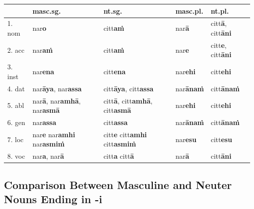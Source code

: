 \documentclass[11pt,oneside]{memoir}
\begin{document}
\begin{center}
\begin{tabular}{lllll}
 & \textbf{masc.sg.} & \textbf{nt.sg.} & \textbf{masc.pl.} & \textbf{nt.pl.}\\
\hline
1. nom & nar\textbf{o} & citt\textbf{aṁ} & nar\textbf{ā} & citt\textbf{ā}, citt\textbf{āni}\\
2. acc & nar\textbf{aṁ} & citt\textbf{aṁ} & nar\textbf{e} & citt\textbf{e}, citt\textbf{āni}\\
3. inst & nar\textbf{ena} & citt\textbf{ena} & nar\textbf{ehi} & citt\textbf{ehi}\\
4. dat & nar\textbf{āya}, nar\textbf{assa} & citt\textbf{āya}, citt\textbf{assa} & nar\textbf{ānaṁ} & citt\textbf{ānaṁ}\\
5. abl & nar\textbf{ā}, nar\textbf{amhā}, nar\textbf{asmā} & citt\textbf{ā}, citt\textbf{amhā}, citt\textbf{asmā} & nar\textbf{ehi} & citt\textbf{ehi}\\
6. gen & nar\textbf{assa} & citt\textbf{assa} & nar\textbf{ānaṁ} & citt\textbf{ānaṁ}\\
7. loc & nar\textbf{e} nar\textbf{amhi} nar\textbf{asmiṁ} & citt\textbf{e} citt\textbf{amhi} citt\textbf{asmiṁ} & nar\textbf{esu} & citt\textbf{esu}\\
8. voc & nar\textbf{a}, nar\textbf{ā} & citt\textbf{a} citt\textbf{ā} & nar\textbf{ā} & citt\textbf{āni}\\
\end{tabular}
\end{center}
\subsection{Comparison Between Masculine and Neuter Nouns Ending in -i}
\label{sec:org24ef34b}
\end{document}
